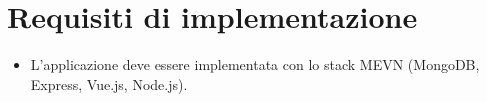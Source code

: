 \section{Requisiti di implementazione}
\begin{itemize}
    \item L'applicazione deve essere implementata con lo stack MEVN (MongoDB, Express, Vue.js, Node.js).
\end{itemize}